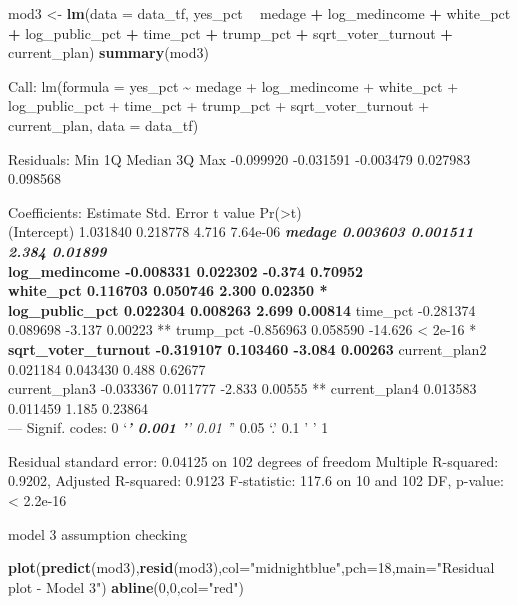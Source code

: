 \documentclass[
]{article}
\newenvironment{Shaded}{\begin{snugshade}}{\end{snugshade}}
\newcommand{\DataTypeTok}[1]{\textcolor[rgb]{0.13,0.29,0.53}{#1}}
\newcommand{\DecValTok}[1]{\textcolor[rgb]{0.00,0.00,0.81}{#1}}
\newcommand{\KeywordTok}[1]{\textcolor[rgb]{0.13,0.29,0.53}{\textbf{#1}}}
\newcommand{\NormalTok}[1]{#1}
\newcommand{\OperatorTok}[1]{\textcolor[rgb]{0.81,0.36,0.00}{\textbf{#1}}}
\newcommand{\StringTok}[1]{\textcolor[rgb]{0.31,0.60,0.02}{#1}}
\begin{document}
\begin{Shaded}
\begin{Highlighting}[]
\NormalTok{mod3 <-}\StringTok{ }\KeywordTok{lm}\NormalTok{(}\DataTypeTok{data =}\NormalTok{ data_tf, yes_pct }\OperatorTok{~}\StringTok{ }\NormalTok{medage }\OperatorTok{+}\StringTok{ }\NormalTok{log_medincome }\OperatorTok{+}\StringTok{ }\NormalTok{white_pct }\OperatorTok{+}\StringTok{ }\NormalTok{log_public_pct }\OperatorTok{+}\StringTok{ }\NormalTok{time_pct }\OperatorTok{+}\StringTok{ }\NormalTok{trump_pct }\OperatorTok{+}\StringTok{ }\NormalTok{sqrt_voter_turnout }\OperatorTok{+}\StringTok{ }\NormalTok{current_plan)}
\KeywordTok{summary}\NormalTok{(mod3)}
\end{Highlighting}
\end{Shaded}

Call: lm(formula = yes\_pct \textasciitilde{} medage + log\_medincome +
white\_pct + log\_public\_pct + time\_pct + trump\_pct +
sqrt\_voter\_turnout + current\_plan, data = data\_tf)

Residuals: Min 1Q Median 3Q Max -0.099920 -0.031591 -0.003479 0.027983
0.098568

Coefficients: Estimate Std. Error t value
Pr(\textgreater\textbar t\textbar)\\
(Intercept) 1.031840 0.218778 4.716 7.64e-06 \textbf{\emph{ medage
0.003603 0.001511 2.384 0.01899 }\\
log\_medincome -0.008331 0.022302 -0.374 0.70952\\
white\_pct 0.116703 0.050746 2.300 0.02350 *\\
log\_public\_pct 0.022304 0.008263 2.699 0.00814 } time\_pct -0.281374
0.089698 -3.137 0.00223 ** trump\_pct -0.856963 0.058590 -14.626
\textless{} 2e-16 *\textbf{ sqrt\_voter\_turnout -0.319107 0.103460
-3.084 0.00263 } current\_plan2 0.021184 0.043430 0.488 0.62677\\
current\_plan3 -0.033367 0.011777 -2.833 0.00555 ** current\_plan4
0.013583 0.011459 1.185 0.23864\\
--- Signif. codes: 0 `\emph{\textbf{' 0.001 '}' 0.01 '}' 0.05 `.' 0.1 '
' 1

Residual standard error: 0.04125 on 102 degrees of freedom Multiple
R-squared: 0.9202, Adjusted R-squared: 0.9123 F-statistic: 117.6 on 10
and 102 DF, p-value: \textless{} 2.2e-16

model 3 assumption checking

\begin{Shaded}
\begin{Highlighting}[]
\KeywordTok{plot}\NormalTok{(}\KeywordTok{predict}\NormalTok{(mod3),}\KeywordTok{resid}\NormalTok{(mod3),}\DataTypeTok{col=}\StringTok{"midnightblue"}\NormalTok{,}\DataTypeTok{pch=}\DecValTok{18}\NormalTok{,}\DataTypeTok{main=}\StringTok{"Residual plot - Model 3"}\NormalTok{)}
\KeywordTok{abline}\NormalTok{(}\DecValTok{0}\NormalTok{,}\DecValTok{0}\NormalTok{,}\DataTypeTok{col=}\StringTok{"red"}\NormalTok{)}
\end{Highlighting}
\end{Shaded}
\end{document}
